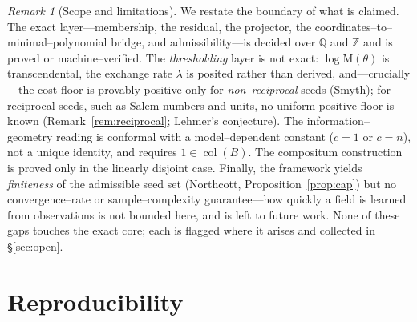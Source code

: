 \documentclass[11pt]{article}
\theoremstyle{plain}
\theoremstyle{definition}
\theoremstyle{remark}
\newtheorem{remark}[theorem]{Remark}
\newcommand{\Q}{\mathbb{Q}}
\newcommand{\Z}{\mathbb{Z}}
\newcommand{\Mah}{\mathrm{M}}
\newcommand{\BB}{B}
\DeclareMathOperator{\col}{col}
\begin{document}
\begin{remark}[Scope and limitations]\label{rem:limits}
We restate the boundary of what is claimed. The exact layer---membership, the residual, the projector, the
coordinates--to--minimal--polynomial bridge, and admissibility---is decided over $\Q$ and $\Z$ and is proved
or machine--verified. The \emph{thresholding} layer is not exact: $\log\Mah(\theta)$ is transcendental, the
exchange rate $\lambda$ is posited rather than derived, and---crucially---the cost floor is provably positive
only for \emph{non--reciprocal} seeds (Smyth); for reciprocal seeds, such as Salem numbers and units, no
uniform positive floor is known (Remark~\ref{rem:reciprocal}; Lehmer's conjecture). The information--geometry
reading is conformal with a model--dependent constant ($c=1$ or $c=n$), not a unique identity, and requires
$1\in\col(\BB)$. The compositum construction is proved only in the linearly disjoint case. Finally, the
framework yields \emph{finiteness} of the admissible seed set (Northcott, Proposition~\ref{prop:cap}) but no
convergence--rate or sample--complexity guarantee---how quickly a field is learned from observations is not
bounded here, and is left to future work. None of these gaps touches the exact core; each is flagged where it
arises and collected in \S\ref{sec:open}.
\end{remark}

\appendix
\section{Reproducibility}\label{sec:appendix}
\end{document}
